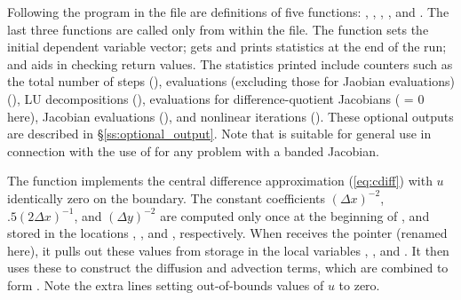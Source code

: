 Following the  program in the  file are definitions of
five functions: , , , , and
.   The last three functions are called only from within the
 file.  The  function sets the initial dependent variable
vector;  gets and prints statistics at the end of the run;
and  aids in checking return values.  The statistics
printed include counters such as the total number of steps (), 
 evaluations (excluding those for Jaobian evaluations) (),
LU decompositions (),  evaluations for
difference-quotient Jacobians ( = 0 here),
Jacobian evaluations (), and nonlinear iterations ().
These optional outputs are described in \S\ref{ss:optional_output}.
Note that  is suitable for general use in connection
with the use of {\cvode} for any problem with a banded Jacobian.

The  function implements the central difference approximation
(\ref{eq:cdiff}) with $u$ identically zero on the boundary. 
The constant coefficients $(\Delta x)^{-2}$, $.5(2 \Delta x)^{-1}$, and 
$(\Delta y)^{-2}$ are computed only once at the beginning of , 
and stored in the locations , , and
, respectively.   When  receives the 
pointer (renamed  here), it pulls out these values from storage
in the local variables , , and .  It then
uses these to construct the diffusion and advection terms, which are
combined to form .  Note the extra lines setting out-of-bounds
values of $u$ to zero.

